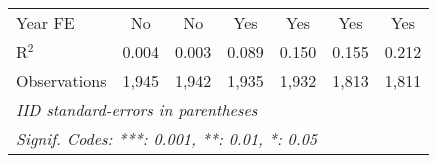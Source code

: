 \begin{table}[htbp]
\begin{tabular}{lcccccc}
      Year FE        & No                           & No                & Yes                          & Yes               & Yes                          & Yes\\  
      R$^2$          & 0.004                        & 0.003             & 0.089                        & 0.150             & 0.155                        & 0.212\\  
      Observations   & 1,945                        & 1,942             & 1,935                        & 1,932             & 1,813                        & 1,811\\  
      \midrule \midrule
      \multicolumn{7}{l}{\emph{IID standard-errors in parentheses}}\\
      \multicolumn{7}{l}{\emph{Signif. Codes: ***: 0.001, **: 0.01, *: 0.05}}\\
   \end{tabular}
\end{table}



